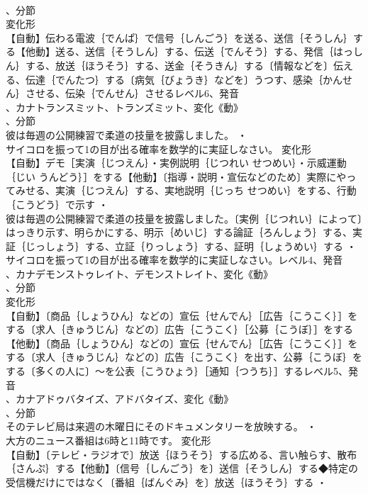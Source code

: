 \documentclass[8pt]{extreport}
\begin{document}
\begin{CJK}{UTF8}{min}
\\	、分節
\\	変化形 
\\	【自動】伝わる電波｛でんぱ｝で信号｛しんごう｝を送る、送信｛そうしん｝する【他動】送る、送信｛そうしん｝する、伝送｛でんそう｝する、発信｛はっしん｝する、放送｛ほうそう｝する、送金｛そうきん｝する〔情報などを〕伝える、伝達｛でんたつ｝する〔病気｛びょうき｝などを〕うつす、感染｛かんせん｝させる、伝染｛でんせん｝させるレベル6、発音
\\	、カナトランスミット、トランズミット、変化《動》
\\	、分節
\\	彼は毎週の公開練習で柔道の技量を披露しました。 ・
\\	サイコロを振って1の目が出る確率を数学的に実証しなさい。	変化形 
\\	【自動】デモ［実演｛じつえん｝・実例説明｛じつれい せつめい｝・示威運動｛じい うんどう｝］をする【他動】〔指導・説明・宣伝などのため〕実際にやってみせる、実演｛じつえん｝する、実地説明｛じっち せつめい｝をする、行動｛こうどう｝で示す ・
\\	彼は毎週の公開練習で柔道の技量を披露しました。〔実例｛じつれい｝によって〕はっきり示す、明らかにする、明示｛めいじ｝する論証｛ろんしょう｝する、実証｛じっしょう｝する、立証｛りっしょう｝する、証明｛しょうめい｝する ・
\\	サイコロを振って1の目が出る確率を数学的に実証しなさい。レベル4、発音
\\	、カナデモンストゥレイト、デモンストレイト、変化《動》
\\	、分節
\\	変化形 
\\	【自動】〔商品｛しょうひん｝などの〕宣伝｛せんでん｝［広告｛こうこく｝］をする〔求人｛きゅうじん｝などの〕広告｛こうこく｝［公募｛こうぼ｝］をする【他動】〔商品｛しょうひん｝などの〕宣伝｛せんでん｝［広告｛こうこく｝］をする〔求人｛きゅうじん｝などの〕広告｛こうこく｝を出す、公募｛こうぼ｝をする〔多くの人に〕～を公表｛こうひょう｝［通知｛つうち｝］するレベル5、発音
\\	、カナアドゥバタイズ、アドバタイズ、変化《動》
\\	、分節
\\	そのテレビ局は来週の木曜日にそのドキュメンタリーを放映する。 ・
\\	大方のニュース番組は6時と11時です。	変化形 
\\	【自動】〔テレビ・ラジオで〕放送｛ほうそう｝する広める、言い触らす、散布｛さんぷ｝する【他動】〔信号｛しんごう｝を〕送信｛そうしん｝する◆特定の受信機だけにではなく〔番組｛ばんぐみ｝を〕放送｛ほうそう｝する ・

\end{CJK}
\end{document}
